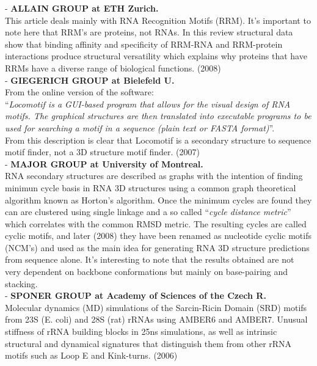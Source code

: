 - \textbf{ALLAIN GROUP at ETH Zurich.}\\
This article deals mainly with RNA Recognition Motifs (RRM). It's
important to note here that RRM's are proteins, not RNAs. In this
review structural data show that binding affinity and
specificity of RRM-RNA and RRM-protein interactions produce structural
versatility which explains why proteins that have RRMs have a diverse
range of biological functions. (2008)
\cite{clery2008}\\

- \textbf{GIEGERICH GROUP at Bielefeld U.}\\
From the online version of the software:\\
``\textit{Locomotif is a GUI-based program that allows for the visual design of
RNA motifs. The graphical structures are then translated into
executable programs to be used for searching a motif in a sequence
(plain text or FASTA format)}''.\\
From this description is clear that Locomotif is a secondary structure
to sequence motif finder, not a 3D structure motif finder. (2007)
\cite{reeder2007}\\

- \textbf{MAJOR GROUP at University of Montreal.}\\
RNA secondary structures are described as graphs with the intention of
finding minimun cycle basis in RNA 3D structures using a common graph
theoretical algorithm known as Horton's algorithm. Once the minimum cycles are
found they can are clustered using single linkage and a so called
``\textit{cycle distance metric}'' which correlates with the common RMSD
metric. The resulting cycles are called cyclic motifs, and later (2008) they
have been renamed as nucleotide cyclic motifs (NCM's) and used as the
main idea for generating RNA 3D structure predictions from sequence alone.
It's interesting to note that the results obtained are not very
dependent on backbone conformations but mainly on base-pairing and stacking.
\cite{lemieux2006}\\

- \textbf{SPONER GROUP at Academy of Sciences of the Czech R.}\\
Molecular  dynamics (MD) simulations of the Sarcin-Ricin Domain (SRD)
motifs from  23S (E. coli)  and 28S  (rat) rRNAs using AMBER6 and
AMBER7. Unusual stiffness of rRNA  building blocks in 25ns
simulations, as  well as intrinsic structural  and dynamical
signatures that distinguish them from other rRNA motifs such as Loop E
and Kink-turns. (2006)
\cite{spackova2006}\\

